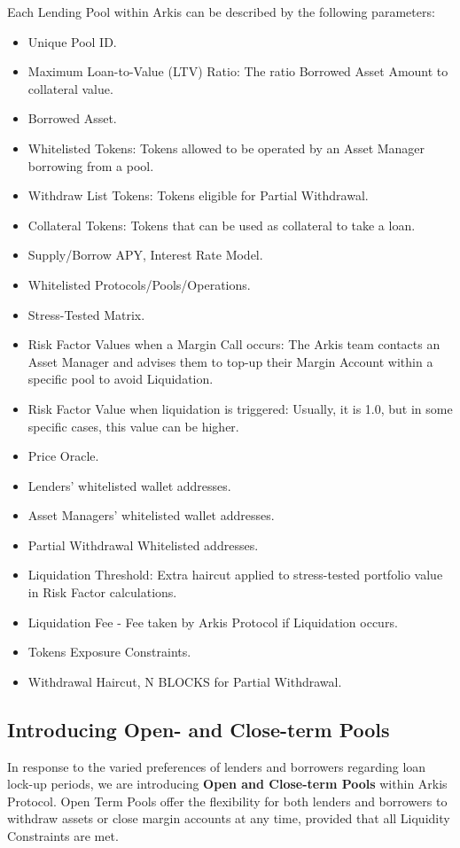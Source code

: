\documentclass[conference]{IEEEtran}
\begin{document}
Each Lending Pool within Arkis can be described by the following parameters:
\begin{itemize}
	\item Unique Pool ID.
	\item Maximum Loan-to-Value (LTV) Ratio: The ratio Borrowed Asset Amount to collateral value.
	\item Borrowed Asset.
	\item Whitelisted Tokens: Tokens allowed to be operated by an Asset Manager borrowing from a pool.
	\item Withdraw List Tokens: Tokens eligible for Partial Withdrawal.
	\item Collateral Tokens: Tokens that can be used as collateral to take a loan.
	\item Supply/Borrow APY, Interest Rate Model.
	\item Whitelisted Protocols/Pools/Operations.
	\item Stress-Tested Matrix.
	\item Risk Factor Values when a Margin Call occurs: The Arkis team contacts an Asset Manager and advises them to top-up their Margin Account within a specific pool to avoid Liquidation.
	\item Risk Factor Value when liquidation is triggered: Usually, it is 1.0, but in some specific cases, this value can be higher.
	\item Price Oracle.
	\item Lenders’ whitelisted wallet addresses.
	\item Asset Managers’ whitelisted wallet addresses.
	\item Partial Withdrawal Whitelisted addresses.
	\item Liquidation Threshold: Extra haircut applied to stress-tested portfolio value in Risk Factor calculations.
	\item Liquidation Fee - Fee taken by Arkis Protocol if Liquidation occurs.
	\item Tokens Exposure Constraints.
	\item Withdrawal Haircut, N BLOCKS for Partial Withdrawal.
\end{itemize}


\subsection{Introducing Open- and Close-term Pools}
In response to the varied preferences of lenders and borrowers regarding loan lock-up periods, we are introducing \textbf{Open and Close-term Pools} within Arkis Protocol. Open Term Pools offer the flexibility for both lenders and borrowers to withdraw assets or close margin accounts at any time, provided that all Liquidity Constraints are met.
\end{document}
